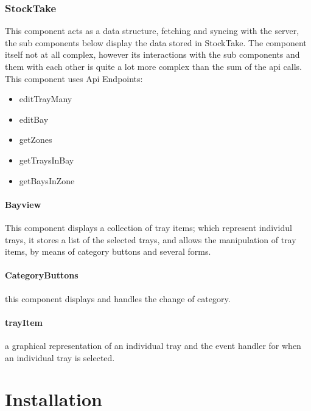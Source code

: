 \documentclass[letterpaper,10pt,english]{sphinxmanual}
\let\oldsubsection\subsection
\renewcommand{\subsection}{\needspace{6\baselineskip}\oldsubsection}
\begin{document}
\subsection{StockTake}
\label{\detokenize{docs/System_Overview/Frontend_overview:stocktake}}
This component acts as a data structure, fetching and syncing with the
server, the sub components below display the data stored in StockTake.
The component itself not at all complex, however its interactions with
the sub components and them with each other is quite a lot more complex
than the sum of the api calls. This component uses Api Endpoints:
\begin{itemize}
\item {} 
editTrayMany

\item {} 
editBay

\item {} 
getZones

\item {} 
getTraysInBay

\item {} 
getBaysInZone

\end{itemize}


\subsubsection{Bayview}
\label{\detokenize{docs/System_Overview/Frontend_overview:bayview}}
This component displays a collection of tray items; which represent
individul trays, it stores a list of the selected trays, and allows the
manipulation of tray items, by means of category buttons and several
forms.


\subsubsection{CategoryButtons}
\label{\detokenize{docs/System_Overview/Frontend_overview:categorybuttons}}
this component displays and handles the change of category.


\subsubsection{trayItem}
\label{\detokenize{docs/System_Overview/Frontend_overview:trayitem}}
a graphical representation of an individual tray and the event handler
for when an individual tray is selected.


\chapter{Installation}
\label{\detokenize{index:installation}}
\end{document}
